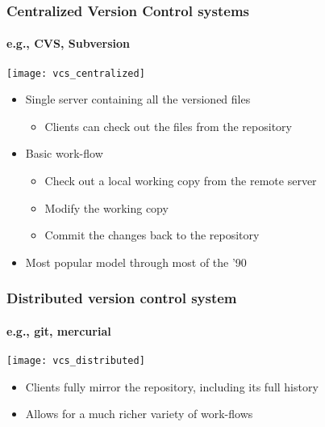 \documentclass[9pt]{beamer}
\begin{document}
\begin{frame}
  \frametitle{Centralized Version Control systems}
  \framesubtitle{e.g., CVS, Subversion}
  \centering\texttt{[image: vcs\_centralized]}
  
  \begin{itemize}
  \item Single server containing all the versioned files
    \begin{itemize}
    \item Clients can check out the files from the repository
    \end{itemize}
  \item Basic work-flow
    \begin{itemize}
    \item Check out a local working copy from the remote server
    \item Modify the working copy
    \item Commit the changes back to the repository
    \end{itemize}
  \item Most popular model through most of the '90
  \end{itemize}
\end{frame}


\begin{frame}
  \frametitle{Distributed version control system}
  \framesubtitle{e.g., git, mercurial}
  \centering\texttt{[image: vcs\_distributed]}
  
  \begin{itemize}
  \item Clients fully mirror the repository, including its full history
  \item Allows for a much richer variety of work-flows
  \end{itemize}
\end{frame}
\end{document}
